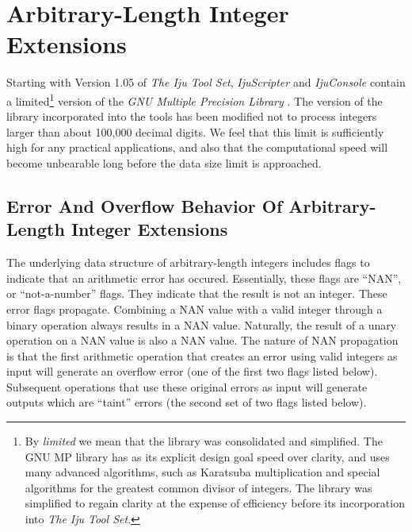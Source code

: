 \section{Arbitrary-Length Integer Extensions}
\label{cxtn0:sarb0}

Starting with Version 1.05 of \emph{The Iju Tool Set}, \emph{IjuScripter} and
\emph{IjuConsole} contain a limited\footnote{By \emph{limited} we mean that
the library was consolidated and simplified.  The GNU MP library has as its
explicit design goal speed over clarity, and uses many advanced algorithms,
such as Karatsuba multiplication and special algorithms for the 
greatest common divisor of integers.  The library was simplified to regain
clarity at the expense of efficiency before its incorporation into
\emph{The Iju Tool Set}.} version of the 
\emph{GNU Multiple Precision
Library} \cite{bibref:s:gnumultipleprecisionarithmeticlibrary}.  
The version of the library incorporated into the tools has been
modified not to process integers larger than about 100,000 decimal digits.
We feel that this limit is sufficiently high for any practical applications,
and also that the computational speed will become unbearable long before the
data size limit is approached.


\subsection{Error And Overflow Behavior Of Arbitrary-Length Integer Extensions}
\label{cxtn0:sarb0:seab0}

The underlying data structure of arbitrary-length integers includes flags
to indicate that an arithmetic error has occured.  Essentially, these flags are
``NAN'', or ``not-a-number'' flags.  They indicate that the result is not
an integer.  These error flags propagate.  Combining a NAN value with a 
valid integer through a binary operation always results in a NAN value.  Naturally,
the result of a unary operation on a NAN value is also a NAN value.
The nature of NAN propagation is that the first arithmetic operation that
creates an error using valid integers as input will generate an overflow error (one of
the first two flags listed below).
Subsequent operations that use these original errors as input will generate
outputs which are ``taint'' errors (the second set of two flags listed below).

